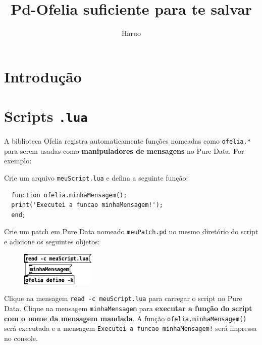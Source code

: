 \documentclass{article}
\title{Pd-Ofelia suficiente para te salvar}
\author{Haruo}
\date{}
\begin{document}
\maketitle

\section{Introdução}



\section{Scripts \texttt{.lua}}

A biblioteca Ofelia registra automaticamente funções nomeadas como \texttt{ofelia.*} para serem usadas como \textbf{manipuladores de mensagens} no Pure Data.\lstset{inputencoding=utf8/latin1}
Por exemplo:

Crie um arquivo \texttt{meuScript.lua} e defina a seguinte função:

\begin{center}
  \begin{lstlisting}
  function ofelia.minhaMensagem();
  print('Executei a funcao minhaMensagem!');
  end;
  \end{lstlisting}
\end{center}

Crie um patch em Pure Data nomeado \texttt{meuPatch.pd} no mesmo diretório do script e adicione os seguintes objetos:

\begin{figure}[h]
  \centering
  \includegraphics[width=100pt]{passo1.png}
\end{figure}

Clique na mensagem \texttt{read -c meuScript.lua} para carregar o script no Pure Data. Clique na mensagem \texttt{minhaMensagem} para \textbf{executar a função do script com o nome da mensagem mandada}. A função \texttt{ofelia.minhaMensagem()} será executada e a mensagem \texttt{Executei a funcao minhaMensagem!} será impressa no console.
\end{document}
